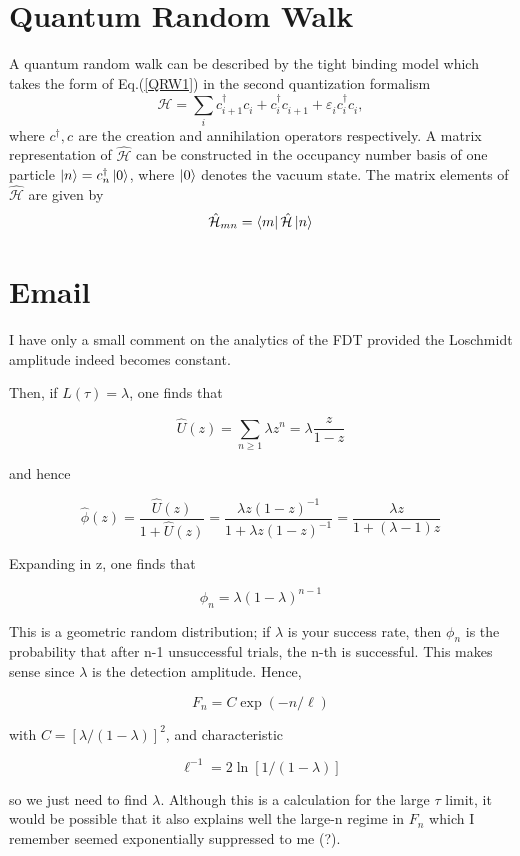 \documentclass{article}
\numberwithin{equation}{section}
\renewcommand{\H}{\mathcal{\hat{H}}}
\newcommand{\1}{\mathbb{1}}
\newcommand{\annihilation}{c^{}}
\newcommand{\creation}{c^{\dagger}}
\begin{document}
\section{Quantum Random Walk}
A quantum random walk can be described by the tight binding model which takes the form of Eq.(\ref{QRW1}) in the second quantization formalism
\begin{equation}\label{QRW1}
    \H=\sum_{i}\creation_{i+1}\annihilation_i+\creation_{i}\annihilation_{i+1}+\varepsilon^{}_i\creation_i\annihilation_i,
\end{equation}
where $\creation,\annihilation$ are the creation and annihilation operators respectively.
A matrix representation of $\H$ can be constructed in the occupancy number basis of one particle $\ket{n}=\creation_n\ket{0}$, where $\ket{0}$ denotes the vacuum state. The matrix elements of $\H$ are given by
\begin{equation}\label{QRW2}
    \H_{mn}=\bra{m}\H\ket{n}
\end{equation}
\section{Email}
I have only a small comment on the analytics of the FDT provided the Loschmidt amplitude indeed becomes constant.

Then, if $L(\tau) = \lambda$, one finds that

$$\hat{U}(z) = \sum_{n \geq 1} \lambda z^n = \lambda \frac{z}{1-z}$$

and hence

$$\hat{\phi}(z) = \frac{\hat{U}(z)}{1 + \hat{U}(z)} = \frac{\lambda z (1-z)^{-1}}{ 1 + \lambda z (1-z)^{-1} } = \frac{\lambda z }{1 + (\lambda - 1) z}$$

Expanding in z, one finds that

$$\phi_n = \lambda(1-\lambda)^{n-1}$$

This is a geometric random distribution; if $\lambda$ is your success rate, then $\phi_n$ is the probability that after n-1 unsuccessful trials, the n-th is successful. This makes sense since $\lambda$ is the detection amplitude. Hence,

$$F_n = C \exp( - n / \ell )$$

with $C = [\lambda/(1-\lambda)]^2$, and characteristic

$$\ell^{-1} = 2 \ln [1 / (1 - \lambda)]$$

so we just need to find $\lambda$. Although this is a calculation for the large $\tau$ limit, it would be possible that it also explains well the large-n regime in $F_n$ which I remember seemed exponentially suppressed to me (?).
\end{document}
